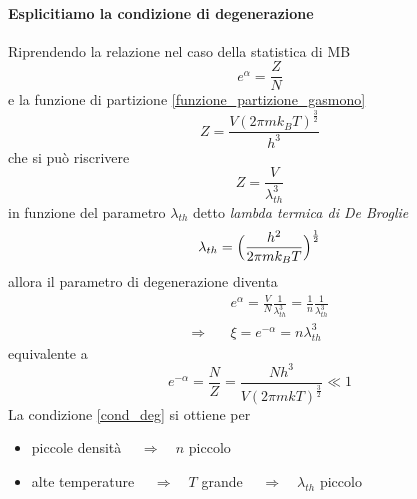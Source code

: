 \paragraph{Esplicitiamo la condizione di degenerazione}
Riprendendo la relazione nel caso della statistica di MB
\begin{equation}
e^{\alpha} = \frac{Z}{N}
\end{equation}
e la funzione di partizione \ref{funzione_partizione_gasmono}
\begin{equation}
Z = \frac{V (2\pi m k_B T)^{ \frac{3}{2} }}{h^3}
\end{equation}
che si può riscrivere 
\begin{equation}
Z = \frac{V}{\lambda_{th}^3}
\end{equation}
in funzione del parametro $\lambda_{th}$ detto \textit{lambda termica di De Broglie}
\begin{equation}
\lambda_{th} = \Bigl(  \frac{h^2}{2 \pi m k_B T}  \Bigr)^{ \frac{1}{2} }
\label{lambda_th_debroglie}
\end{equation}
allora il parametro di degenerazione diventa
\begin{equation}
\begin{split}
& e^{\alpha} = \frac{V}{N} \frac{1}{\lambda_{th}^3} = \frac{1}{n} \frac{1}{\lambda_{th}^3} \\
\Rightarrow\quad & \xi = e^{-\alpha} = n \lambda_{th}^3
\label{disaccordo1}
\end{split}
\end{equation}
equivalente a
\begin{equation}
e^{-\alpha} = \frac{N}{Z} =  \frac{N h^3}{V (2 \pi m k T)^{\frac{3}{2}}} \ll 1
\end{equation}
La condizione \ref{cond_deg} si ottiene per
\begin{itemize}
\item piccole densità $\quad\Rightarrow\quad n$ piccolo 
\item alte temperature $\quad\Rightarrow\quad T$ grande $\quad\Rightarrow\quad \lambda_{th}$ piccolo
\end{itemize}


